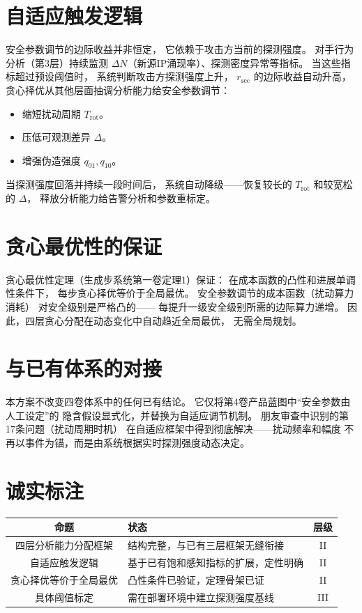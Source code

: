 \documentclass[11pt,a4paper]{article}
\begin{document}
\section{自适应触发逻辑}

安全参数调节的边际收益并非恒定，
它依赖于攻击方当前的探测强度。
对手行为分析（第3层）持续监测
\(\Delta N\)（新源IP涌现率）、探测密度异常等指标。
当这些指标超过预设阈值时，
系统判断攻击方探测强度上升，
\(r_{\text{sec}}\) 的边际收益自动升高，
贪心择优从其他层面抽调分析能力给安全参数调节：
\begin{itemize}
    \item 缩短扰动周期 \(T_{\text{rot}}\)。
    \item 压低可观测差异 \(\Delta\)。
    \item 增强伪造强度 \(q_{01}, q_{10}\)。
\end{itemize}
当探测强度回落并持续一段时间后，
系统自动降级——恢复较长的 \(T_{\text{rot}}\) 和较宽松的 \(\Delta\)，
释放分析能力给告警分析和参数重标定。

\section{贪心最优性的保证}

贪心最优性定理（生成步系统第一卷定理1）保证：
在成本函数的凸性和进展单调性条件下，
每步贪心择优等价于全局最优。
安全参数调节的成本函数（扰动算力消耗）
对安全级别是严格凸的——
每提升一级安全级别所需的边际算力递增。
因此，四层贪心分配在动态变化中自动趋近全局最优，
无需全局规划。

\section{与已有体系的对接}

本方案不改变四卷体系中的任何已有结论。
它仅将第4卷产品蓝图中“安全参数由人工设定”的
隐含假设显式化，并替换为自适应调节机制。
朋友审查中识别的第17条问题（扰动周期时机）
在自适应框架中得到彻底解决——扰动频率和幅度
不再以事件为锚，而是由系统根据实时探测强度动态决定。

\section{诚实标注}

\begin{center}
\begin{xltabular}{\textwidth}{c|X|c}
\toprule
\textbf{命题} & \textbf{状态} & \textbf{层级} \\
\midrule
四层分析能力分配框架 & 结构完整，与已有三层框架无缝衔接 & II \\
自适应触发逻辑 & 基于已有饱和感知指标的扩展，定性明确 & II \\
贪心择优等价于全局最优 & 凸性条件已验证，定理骨架已证 & II \\
具体阈值标定 & 需在部署环境中建立探测强度基线 & III \\
\bottomrule
\end{xltabular}
\end{center}
\end{document}
